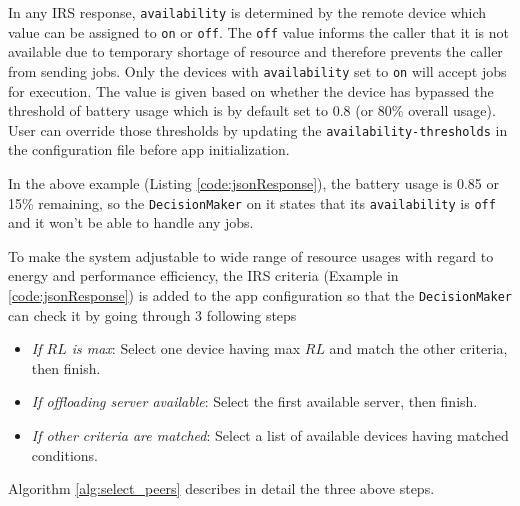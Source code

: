 \documentclass{sig-alternate}[10pt]
\begin{document}
In any IRS response, \texttt{availability} is determined by the remote device which value can be assigned to \texttt{on} or \texttt{off}. The \texttt{off} value informs the caller that it is not available due to temporary shortage of resource and therefore prevents the caller from sending jobs. Only the devices with \texttt{availability} set to \texttt{on} will accept jobs for execution. The value is given based on whether the device has bypassed the threshold of battery usage which is by default set to 0.8 (or 80\% overall usage). User can override those thresholds by updating the \texttt{availability-thresholds} in the configuration file before app initialization. 

In the above example (Listing \ref{code:jsonResponse}), the battery usage is 0.85 or 15\% remaining, so the \texttt{DecisionMaker} on it states that its \texttt{availability} is \texttt{off} and it won't be able to handle any jobs.

To make the system adjustable to wide range of resource usages with regard to energy and performance efficiency, the IRS criteria (Example in \ref{code:jsonResponse}) is added to the app configuration so that the \texttt{DecisionMaker} can check it by going through 3 following steps
\begin{itemize}
	\item \emph{If $RL$ is max}: Select one device having max $RL$ and match the other criteria, then finish.
	\item \emph{If offloading server available}: Select the first available server, then finish.
	\item \emph{If other criteria are matched}: Select a list of available devices having matched conditions.
\end{itemize}
Algorithm \ref{alg:select_peers} describes in detail the three above steps.
\end{document}
